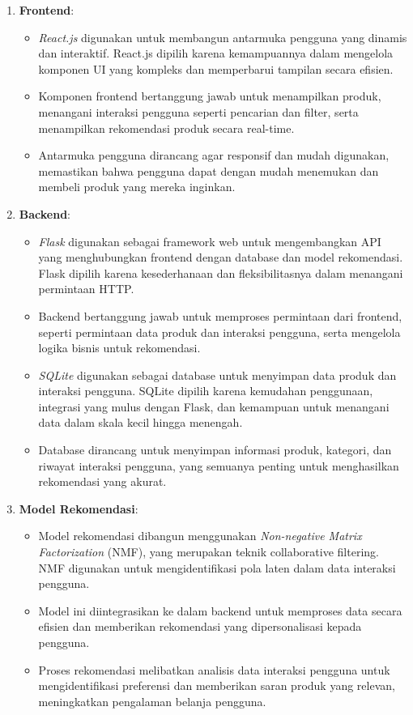 \documentclass[journal,article,submit,pdftex,moreauthors]{Definitions/mdpi}
\begin{document}
\begin{enumerate}
    \item \textbf{Frontend}:
    \begin{itemize}
        \item \textit{React.js} digunakan untuk membangun antarmuka pengguna yang dinamis dan interaktif. React.js dipilih karena kemampuannya dalam mengelola komponen UI yang kompleks dan memperbarui tampilan secara efisien.
        \item Komponen frontend bertanggung jawab untuk menampilkan produk, menangani interaksi pengguna seperti pencarian dan filter, serta menampilkan rekomendasi produk secara real-time.
        \item Antarmuka pengguna dirancang agar responsif dan mudah digunakan, memastikan bahwa pengguna dapat dengan mudah menemukan dan membeli produk yang mereka inginkan.
    \end{itemize}

    \item \textbf{Backend}:
    \begin{itemize}
        \item \textit{Flask} digunakan sebagai framework web untuk mengembangkan API yang menghubungkan frontend dengan database dan model rekomendasi. Flask dipilih karena kesederhanaan dan fleksibilitasnya dalam menangani permintaan HTTP.
        \item Backend bertanggung jawab untuk memproses permintaan dari frontend, seperti permintaan data produk dan interaksi pengguna, serta mengelola logika bisnis untuk rekomendasi.
        \item \textit{SQLite} digunakan sebagai database untuk menyimpan data produk dan interaksi pengguna. SQLite dipilih karena kemudahan penggunaan, integrasi yang mulus dengan Flask, dan kemampuan untuk menangani data dalam skala kecil hingga menengah.
        \item Database dirancang untuk menyimpan informasi produk, kategori, dan riwayat interaksi pengguna, yang semuanya penting untuk menghasilkan rekomendasi yang akurat.
    \end{itemize}

    \item \textbf{Model Rekomendasi}:
    \begin{itemize}
        \item Model rekomendasi dibangun menggunakan \textit{Non-negative Matrix Factorization} (NMF), yang merupakan teknik collaborative filtering. NMF digunakan untuk mengidentifikasi pola laten dalam data interaksi pengguna.
        \item Model ini diintegrasikan ke dalam backend untuk memproses data secara efisien dan memberikan rekomendasi yang dipersonalisasi kepada pengguna.
        \item Proses rekomendasi melibatkan analisis data interaksi pengguna untuk mengidentifikasi preferensi dan memberikan saran produk yang relevan, meningkatkan pengalaman belanja pengguna.
    \end{itemize}
\end{enumerate}
\end{document}
